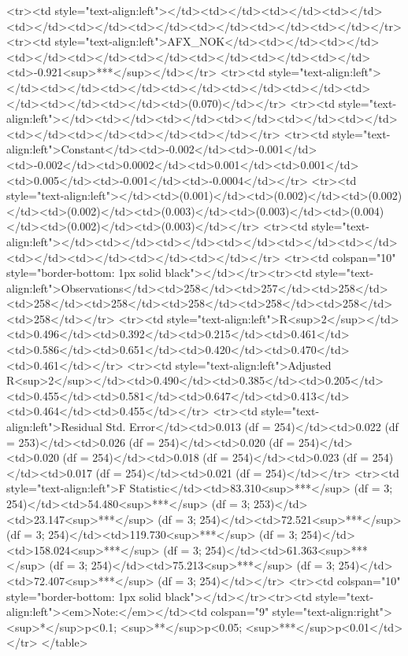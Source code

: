 <tr><td style="text-align:left"></td><td></td><td></td><td></td><td></td><td></td><td></td><td></td><td></td><td></td></tr>
<tr><td style="text-align:left">AFX_NOK</td><td></td><td></td><td></td><td></td><td></td><td></td><td></td><td></td><td>-0.921<sup>***</sup></td></tr>
<tr><td style="text-align:left"></td><td></td><td></td><td></td><td></td><td></td><td></td><td></td><td></td><td>(0.070)</td></tr>
<tr><td style="text-align:left"></td><td></td><td></td><td></td><td></td><td></td><td></td><td></td><td></td><td></td></tr>
<tr><td style="text-align:left">Constant</td><td>-0.002</td><td>-0.001</td><td>-0.002</td><td>0.0002</td><td>0.001</td><td>0.001</td><td>0.005</td><td>-0.001</td><td>-0.0004</td></tr>
<tr><td style="text-align:left"></td><td>(0.001)</td><td>(0.002)</td><td>(0.002)</td><td>(0.002)</td><td>(0.003)</td><td>(0.003)</td><td>(0.004)</td><td>(0.002)</td><td>(0.003)</td></tr>
<tr><td style="text-align:left"></td><td></td><td></td><td></td><td></td><td></td><td></td><td></td><td></td><td></td></tr>
<tr><td colspan="10" style="border-bottom: 1px solid black"></td></tr><tr><td style="text-align:left">Observations</td><td>258</td><td>257</td><td>258</td><td>258</td><td>258</td><td>258</td><td>258</td><td>258</td><td>258</td></tr>
<tr><td style="text-align:left">R<sup>2</sup></td><td>0.496</td><td>0.392</td><td>0.215</td><td>0.461</td><td>0.586</td><td>0.651</td><td>0.420</td><td>0.470</td><td>0.461</td></tr>
<tr><td style="text-align:left">Adjusted R<sup>2</sup></td><td>0.490</td><td>0.385</td><td>0.205</td><td>0.455</td><td>0.581</td><td>0.647</td><td>0.413</td><td>0.464</td><td>0.455</td></tr>
<tr><td style="text-align:left">Residual Std. Error</td><td>0.013 (df = 254)</td><td>0.022 (df = 253)</td><td>0.026 (df = 254)</td><td>0.020 (df = 254)</td><td>0.020 (df = 254)</td><td>0.018 (df = 254)</td><td>0.023 (df = 254)</td><td>0.017 (df = 254)</td><td>0.021 (df = 254)</td></tr>
<tr><td style="text-align:left">F Statistic</td><td>83.310<sup>***</sup> (df = 3; 254)</td><td>54.480<sup>***</sup> (df = 3; 253)</td><td>23.147<sup>***</sup> (df = 3; 254)</td><td>72.521<sup>***</sup> (df = 3; 254)</td><td>119.730<sup>***</sup> (df = 3; 254)</td><td>158.024<sup>***</sup> (df = 3; 254)</td><td>61.363<sup>***</sup> (df = 3; 254)</td><td>75.213<sup>***</sup> (df = 3; 254)</td><td>72.407<sup>***</sup> (df = 3; 254)</td></tr>
<tr><td colspan="10" style="border-bottom: 1px solid black"></td></tr><tr><td style="text-align:left"><em>Note:</em></td><td colspan="9" style="text-align:right"><sup>*</sup>p<0.1; <sup>**</sup>p<0.05; <sup>***</sup>p<0.01</td></tr>
</table>

